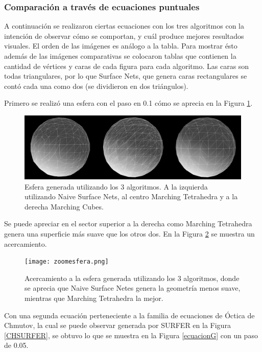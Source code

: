 \documentclass[12pt]{article}
\begin{document}
\subsubsection{Comparación a través de ecuaciones puntuales}
A continuación se realizaron ciertas ecuaciones con los tres algoritmos con la intención de observar cómo se comportan, y cuál produce mejores resultados visuales. El orden de las imágenes es análogo a la tabla. Para mostrar ésto además de las imágenes comparativas se colocaron tablas que contienen la cantidad de vértices y caras de cada figura para cada algoritmo. Las caras son todas triangulares, por lo que Surface Nets, que genera caras rectangulares se contó cada una como dos (se dividieron en dos triángulos).

Primero se realizó una esfera con el paso en 0.1 cómo se aprecia en la Figura \ref{esf1g}.

\begin{figure}[h!]
\includegraphics[width=\linewidth,center]{compec1.png}
\caption{Esfera generada utilizando los 3 algoritmos. A la izquierda utilizando Naive Surface Nets, al centro Marching Tetrahedra y a la derecha Marching Cubes.}
  \label{esf1g}
\end{figure}

Se puede apreciar en el sector superior a la derecha como Marching Tetrahedra genera una superficie más suave que los otros dos. En la Figura \ref{acercamientoEsf} se muestra un acercamiento.

\begin{figure}[h!]
\texttt{[image: zoomesfera.png]}
\caption{Acercamiento a la esfera generada utilizando los 3 algoritmos, donde se aprecia que Naive Surface Netes genera la geometría menos suave, mientras que Marching Tetrahedra la mejor.}
\label{acercamientoEsf}
\end{figure}

Con una segunda ecuación perteneciente a la familia de ecuaciones de Óctica de Chmutov, la cual se puede observar generada por SURFER en la Figura \ref{CHSURFER}, se obtuvo lo que se muestra en la Figura \ref{ecuacionG} con un paso de 0.05.
\end{document}
